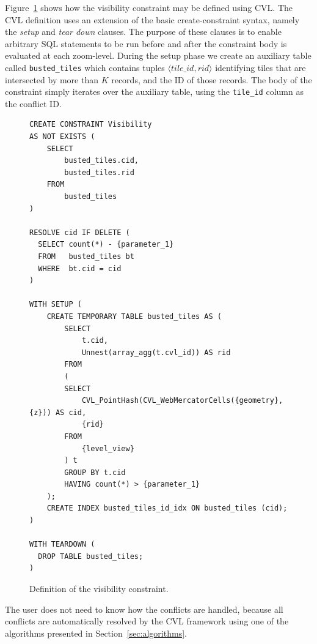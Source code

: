 Figure~\ref{fig:visibility:definition} shows how the visibility constraint may be defined using CVL. The CVL definition uses an extension of the basic create-constraint syntax, namely the \emph{setup} and \emph{tear down} clauses. 
The purpose of these clauses is to enable arbitrary SQL statements to be run before and after the constraint body is evaluated at each zoom-level. During the setup phase we create an auxiliary table called \texttt{busted\_tiles} which contains tuples $\langle tile\_id, rid \rangle$ identifying tiles that are intersected by more than $K$ records, and the ID of those records. The body of the constraint simply iterates over the auxiliary table, using the \texttt{tile\_id} column as the conflict ID.



\begin{figure}[htbp]
\begin{center}
\begin{lstlisting}
CREATE CONSTRAINT Visibility
AS NOT EXISTS (
    SELECT
        busted_tiles.cid,
        busted_tiles.rid
    FROM
        busted_tiles
)

RESOLVE cid IF DELETE (
  SELECT count(*) - {parameter_1}
  FROM   busted_tiles bt
  WHERE  bt.cid = cid
)

WITH SETUP (
    CREATE TEMPORARY TABLE busted_tiles AS (
        SELECT
            t.cid,
            Unnest(array_agg(t.cvl_id)) AS rid
        FROM
        (
        SELECT
            CVL_PointHash(CVL_WebMercatorCells({geometry}, {z})) AS cid,
            {rid}
        FROM
            {level_view}
        ) t
        GROUP BY t.cid
        HAVING count(*) > {parameter_1}
    );
    CREATE INDEX busted_tiles_id_idx ON busted_tiles (cid);
)

WITH TEARDOWN (
  DROP TABLE busted_tiles;
)
\end{lstlisting}
\vspace*{-1.5ex}
\caption{Definition of the visibility constraint.}
\label{fig:visibility:definition}
\end{center}
\vspace*{-3ex}
\end{figure}


The user does not need to know how the conflicts are handled, because all conflicts are automatically resolved by the CVL framework using one of the algorithms presented in Section~\ref{sec:algorithms}.




